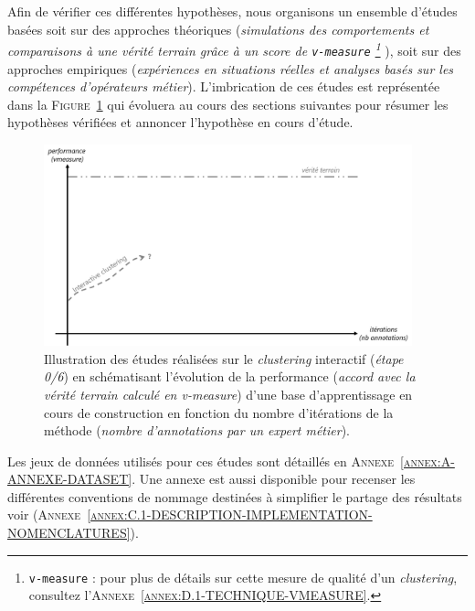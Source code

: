 	Afin de vérifier ces différentes hypothèses, nous organisons un ensemble d'études basées soit sur des approches théoriques (\textit{simulations des comportements et comparaisons à une vérité terrain grâce à un score de \texttt{v-measure} \footnote{
		\texttt{v-measure} : pour plus de détails sur cette mesure de qualité d'un \textit{clustering}, consultez l'\textsc{Annexe~\ref{annex:D.1-TECHNIQUE-VMEASURE}}.
	} }), soit sur des approches empiriques (\textit{expériences en situations réelles et analyses basés sur les compétences d'opérateurs métier}).
	L'imbrication de ces études est représentée dans la \textsc{Figure~\ref{figure:4.0-HYPOTHESE-00-DEFAULT}} qui évoluera au cours des sections suivantes pour résumer les hypothèses vérifiées et annoncer l'hypothèse en cours d'étude.
	\begin{figure}[!htb]
		\centering
		\includegraphics[width=0.95\textwidth]{figures/hypotheses-00-default}
		\caption{
			Illustration des études réalisées sur le \textit{clustering} interactif (\textit{étape 0/6}) en schématisant l'évolution de la performance (\textit{accord avec la vérité terrain calculé en v-measure}) d'une base d'apprentissage en cours de construction en fonction du nombre d'itérations de la méthode (\textit{nombre d'annotations par un expert métier}).
		}
		\label{figure:4.0-HYPOTHESE-00-DEFAULT}
	\end{figure}
		
	\begin{leftBarInformation}
		Les jeux de données utilisés pour ces études sont détaillés en \textsc{Annexe~\ref{annex:A-ANNEXE-DATASET}}.
		Une annexe est aussi disponible pour recenser les différentes conventions de nommage destinées à simplifier le partage des résultats voir (\textsc{Annexe~\ref{annex:C.1-DESCRIPTION-IMPLEMENTATION-NOMENCLATURES}}).
	\end{leftBarInformation}
	
